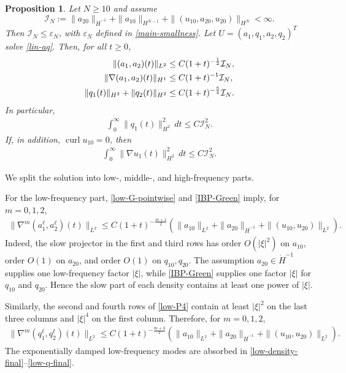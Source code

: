 \documentclass[10pt,reqno]{amsart}
\numberwithin{equation}{section}
\newtheorem{prop}[thm]{Proposition}
\begin{document}
 
\begin{prop}\label{prop-linear-decay}
Let $N\ge10$ and assume
\[%
\mathcal I_N :=\|a_{20}\|_{\dot H^{-1}} +\|a_{10}\|_{H^{N-1}} +\|(u_{10},a_{20},u_{20})\|_{H^N}<\infty.
\]%
Then $\mathcal I_N\le \varepsilon_N$, with $\varepsilon_N$ defined in \eqref{main-smallness}.
Let $U=(a_1,q_1,a_2,q_2)^T$ solve \eqref{lin-aq}. Then, for all $t\ge0$,
\begin{align}\label{linear-density-decay}
\|(a_1,a_2)(t)\|_{L^2}
&\le C(1+t)^{-\frac12}\mathcal I_N,\\
\|\nabla(a_1,a_2)(t)\|_{H^1}
&\le C(1+t)^{-1}\mathcal I_N, \notag\\
\label{linear-q-decay}
\|q_1(t)\|_{H^2}+\|q_2(t)\|_{H^2}
&\le C(1+t)^{-\frac54}\mathcal I_N.
\end{align}
In particular,
\begin{align}\label{linear-q-integrable}
\int_0^\infty\|q_1(t)\|_{H^2}^2\,dt
\le C\mathcal I_N^2.
\end{align}
If, in addition, $\operatorname{curl}u_{10}=0$, then
\begin{align}\label{linear-u1-integrable}
\int_0^\infty\|\nabla u_1(t)\|_{H^2}^2\,dt
\le C\mathcal I_N^2.
\end{align}
\end{prop}

\proof
We split the solution into low-, middle-, and high-frequency parts.

For the low-frequency part, \eqref{low-G-pointwise} and \eqref{IBP-Green} imply, for $m=0,1,2$,
\begin{align}\label{low-density-final}
\|\nabla^m(a_1^\ell,a_2^\ell)(t)\|_{L^2}
\le C(1+t)^{-\frac{m+1}{2}}
\left(\|a_{10}\|_{L^2}+\|a_{20}\|_{\dot H^{-1}}+\|(u_{10},u_{20})\|_{L^2}\right).
\end{align}
Indeed, the slow projector in the first and third rows has order $O(|\xi|^2)$ on $a_{10}$, order $O(1)$ on $a_{20}$, and order $O(1)$ on $q_{10},q_{20}$. The assumption $a_{20}\in\dot H^{-1}$ supplies one low-frequency factor $|\xi|$, while \eqref{IBP-Green} supplies one factor $|\xi|$ for $q_{10}$ and $q_{20}$. Hence the slow part of each density contains at least one power of $|\xi|$.

Similarly, the second and fourth rows of \eqref{low-P4} contain at least $|\xi|^2$ on the last three columns and $|\xi|^4$ on the first column. Therefore, for $m=0,1,2$,
\begin{align}\label{low-q-final}
\|\nabla^m(q_1^\ell,q_2^\ell)(t)\|_{L^2}
\le C(1+t)^{-\frac{m+3}{2}}
\left(\|a_{10}\|_{L^2}+\|a_{20}\|_{\dot H^{-1}}+\|(u_{10},u_{20})\|_{L^2}\right).
\end{align}
The exponentially damped low-frequency modes are absorbed in \eqref{low-density-final}--\eqref{low-q-final}.
\end{document}
